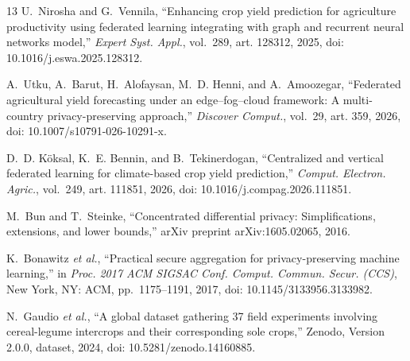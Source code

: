 \documentclass[journal]{IEEEtran}
\begin{document}
\begin{thebibliography}{13}
U.~Nirosha and G.~Vennila,
``Enhancing crop yield prediction for agriculture productivity using federated
learning integrating with graph and recurrent neural networks model,''
\emph{Expert Syst. Appl.}, vol.~289, art. 128312, 2025,
doi: 10.1016/j.eswa.2025.128312.

A.~Utku, A.~Barut, H.~Alofaysan, M.~D. Henni, and A.~Amoozegar,
``Federated agricultural yield forecasting under an edge--fog--cloud framework:
A multi-country privacy-preserving approach,''
\emph{Discover Comput.}, vol.~29, art. 359, 2026,
doi: 10.1007/s10791-026-10291-x.

D.~D. K{\"o}ksal, K.~E. Bennin, and B.~Tekinerdogan,
``Centralized and vertical federated learning for climate-based crop yield
prediction,''
\emph{Comput. Electron. Agric.}, vol.~249, art. 111851, 2026,
doi: 10.1016/j.compag.2026.111851.

M.~Bun and T.~Steinke,
``Concentrated differential privacy: Simplifications, extensions, and lower
bounds,''
arXiv preprint arXiv:1605.02065, 2016.

K.~Bonawitz \emph{et al.},
``Practical secure aggregation for privacy-preserving machine learning,''
in \emph{Proc. 2017 ACM SIGSAC Conf. Comput. Commun. Secur. (CCS)},
New York, NY: ACM, pp.~1175--1191, 2017,
doi: 10.1145/3133956.3133982.

N.~Gaudio \emph{et al.},
``A global dataset gathering 37 field experiments involving cereal-legume
intercrops and their corresponding sole crops,''
Zenodo, Version 2.0.0, dataset, 2024,
doi: 10.5281/zenodo.14160885.

\end{thebibliography}
\end{document}
